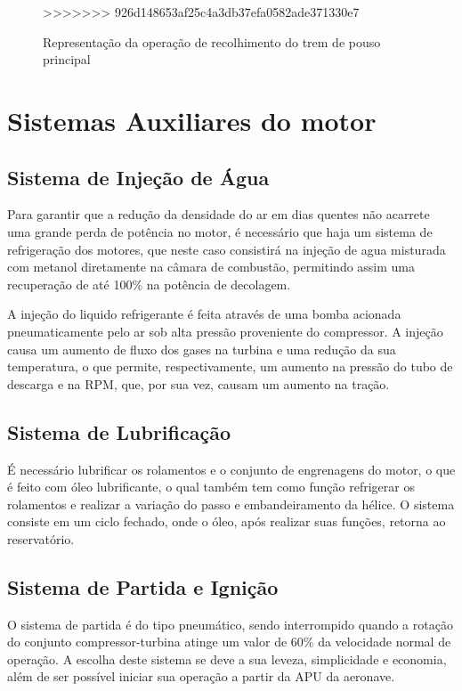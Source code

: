 \begin{figure}
\caption{Representação da operação de recolhimento do trem de pouso principal}
>>>>>>> 926d148653af25c4a3db37efa0582ade371330e7
\label{fig:sistemas_trem_de_pouso}
\end{figure}


\section{Sistemas Auxiliares do motor}

\subsection{Sistema de Injeção de Água}

Para garantir que a redução da densidade do ar em dias quentes não acarrete uma grande perda de potência no motor, é necessário que haja um sistema de refrigeração dos motores, que neste caso consistirá na injeção de agua misturada com metanol diretamente na câmara de combustão, permitindo assim uma recuperação de até 100\% na potência de decolagem.

A injeção do liquido refrigerante é feita através de uma bomba acionada pneumaticamente pelo ar sob alta pressão proveniente do compressor.
A injeção causa um aumento de fluxo dos gases na turbina e uma redução da sua temperatura, o que permite, respectivamente, um aumento na pressão do tubo de descarga e na RPM, que, por sua vez, causam um aumento na tração.

\subsection{Sistema de Lubrificação}

É necessário lubrificar os rolamentos e o conjunto de engrenagens do motor, o que é feito com óleo lubrificante, o qual também tem como função refrigerar os rolamentos e realizar a variação do passo e embandeiramento da hélice.
O sistema consiste em um ciclo fechado, onde o óleo, após realizar suas funções, retorna ao reservatório.

\subsection{Sistema de Partida e Ignição}

O sistema de partida é do tipo pneumático, sendo interrompido quando a rotação do conjunto compressor-turbina atinge um valor de 60\% da velocidade normal de operação.
A escolha deste sistema se deve a sua leveza, simplicidade e economia, além de ser possível iniciar sua operação a partir da APU da aeronave.

